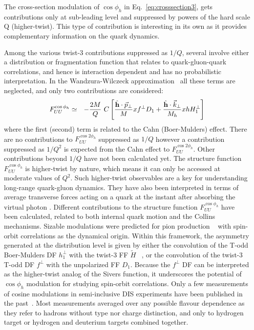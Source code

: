 \documentclass[aps,prl,twocolumn,showpacs,superscriptaddress,groupedaddress]{revtex4}  %
\newcommand{\FUUc}{F_{UU}^{\cos\phi_h}}
\newcommand{\FUUcc}{F_{UU}^{\cos2\phi_h}}
\newcommand{\kt}{\vec{k}_\perp}
\newcommand{\pt}{\vec{p}_\perp}
\newcommand{\ph}{\phi_h}
\begin{document}
The cross-section modulation of  $\cos \phi_h $ in Eq.~\ref{eq:crosssection3}, gets contributions only
at sub-leading level and suppressed by powers of the hard scale Q (higher-twist).
This type of contribution is interesting in its own as it provides complementary information
on the quark dynamics.

Among the various twist-3 contributions suppressed as $1/Q$, several involve
either a distribution or fragmentation function that relates to
quark-gluon-quark correlations, and hence is interaction dependent and has no probabilistic
interpretation. In the Wandzura-Wilczeck approximation~\cite{Wandzura:1977qf}
all these terms are neglected, and only two contributions are considered: %
\begin{eqnarray} \nonumber
\label{Eq:cosphi}
\FUUc & \simeq & -\frac{2M}{Q}\  C\left[\frac{ \hat{\bf h} \cdot \pt}{M} xf^\perp D_1 +
\frac{\hat{\bf h} \cdot \kt}{M_h} 
xh H_1^\perp \right] \\
\end{eqnarray}
where the first (second) term is related to the Cahn (Boer-Mulders) effect.
There are no contributions to $\FUUcc$ suppressed as $1/Q$ however a contribution suppressed as $1/Q^2$ is expected from the Cahn effect to $\FUUcc$.
Other contributions beyond $1/Q$ have not been calculated yet.
The structure function $F^{\cos \ph}_{UU}$ is higher-twist by nature, which means it can only be accessed at moderate values of $Q^2$.
Such higher-twist observables are a key for understanding long-range quark-gluon dynamics.
They have also been interpreted in terms of average transverse forces acting on a quark at the instant after absorbing the virtual photon \cite{Burkardt:2008vd}.
Different contributions to the structure function  $F^{\cos \ph}_{UU}$ have been calculated, related to both internal quark motion and the Collins mechanisms.
Sizable modulations  were predicted for pion production ~\cite{Anselmino:2005nn} with spin-orbit correlations   as the dynamical origin.
Within this framework, the asymmetry generated at the distribution level is given by either the convolution of the T-odd Boer-Mulders DF $h_1^{\perp}$ with the twist-3 FF $\tilde{H}$ ~\cite{Bacchetta:2006tn}, or the convolution of the  twist-3 T-odd DF $f^\perp$ with the unpolarized FF $D_1$\cite{Metz:2004je}.
Because the $f^\perp$ DF can be interpreted as the higher-twist analog of the Sivers function, it underscores the potential of $\cos\phi_h$ modulation for studying spin-orbit correlations. 
Only a few measurements of cosine modulations in semi-inclusive DIS experiments have been published in the past~\cite{Aubert:1983cz,Arneodo:1986cf,Adams:1993hs,Breitweg:2000qh}.
Most measurements averaged over any possible flavour dependence as they refer to hadrons without type nor charge distinction, and only to hydrogen target or hydrogen and deuterium targets combined together.
\end{document}

